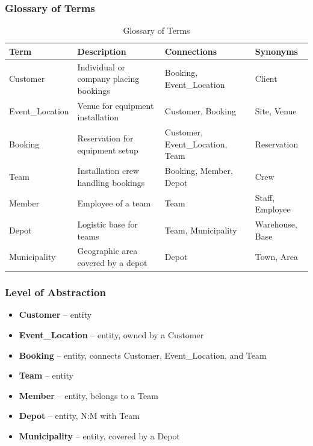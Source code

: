 \subsubsection{Glossary of Terms}
\begin{table}[H]
    \renewcommand{\arraystretch}{1.3}
    \begin{tabularx}{\textwidth}{|X|X|X|X|}
    \hline
    \textbf{Term} & \textbf{Description} & \textbf{Connections} & \textbf{Synonyms} \\ \hline
    Customer      & Individual or company placing bookings & Booking, Event\_Location & Client \\ \hline
    Event\_Location & Venue for equipment installation & Customer, Booking & Site, Venue \\ \hline
    Booking       & Reservation for equipment setup & Customer, Event\_Location, Team & Reservation \\ \hline
    Team          & Installation crew handling bookings & Booking, Member, Depot & Crew \\ \hline
    Member        & Employee of a team & Team & Staff, Employee \\ \hline
    Depot         & Logistic base for teams & Team, Municipality & Warehouse, Base \\ \hline
    Municipality  & Geographic area covered by a depot & Depot & Town, Area \\ \hline
    \end{tabularx}
    \caption{Glossary of Terms}
\end{table}

\subsubsection{Level of Abstraction}
\begin{itemize}
    \item \textbf{Customer} -- entity
    \item \textbf{Event\_Location} -- entity, owned by a Customer
    \item \textbf{Booking} -- entity, connects Customer, Event\_Location, and Team
    \item \textbf{Team} -- entity
    \item \textbf{Member} -- entity, belongs to a Team
    \item \textbf{Depot} -- entity, N:M with Team
    \item \textbf{Municipality} -- entity, covered by a Depot
\end{itemize}

